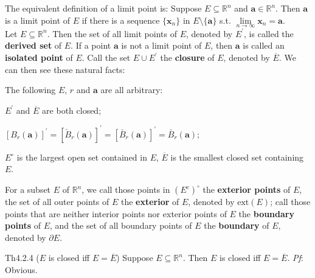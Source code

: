 \documentclass{article}
\begin{document}
\begin{Rmk}{}
    The equivalent definition of a limit point is: \textcolor{Df}{Suppose $E\subseteq\mathbb{R}^n$ and $\pmb{a}\in\mathbb{R}^n$. Then $\pmb{a}$ is a limit point of $E$ if there is a sequence $\{\pmb{x}_n\}$ in $E\setminus\{\pmb{a}\}$ s.t. $\lim\limits_{n\to\infty} \pmb{x}_n = \pmb{a}$.}\\
    \textcolor{Df}{Let $E\subseteq\mathbb{R}^n$. Then the set of all limit points of $E$, denoted by $E^\prime$, is called the \textbf{derived set} of $E$. If a point $\pmb{a}$ is not a limit point of $E$, then $\pmb{a}$ is called an \textbf{isolated point} of $E$. Call the set $E\cup E^\prime$ the \textbf{closure} of $E$, denoted by $\overline{E}$.} We can then see these natural facts: 
    \textcolor{Th}{The following $E$, $r$ and $\pmb{a}$ are all arbitrary:
    \begin{compactenum}
        \item $E^\prime$ and $\overline{E}$ are both closed;
        \item $[B_r(\pmb{a})]^\prime = [\check{B}_r(\pmb{a})]^\prime = [\bar{B}_r(\pmb{a})]^\prime = \bar{B}_r(\pmb{a})$;
        \item $E^\circ$ is the largest open set contained in $E$, $\overline{E}$ is the smallest closed set containing $E$.
    \end{compactenum}}
    \textcolor{Df}{For a subset $E$ of $\mathbb{R}^n$, we call those points in $(E^c)^\circ$ the \textbf{exterior points} of $E$, the set of all outer points of $E$ the \textbf{exterior} of $E$, denoted by $\text{ext}(E)$; call those points that are neither interior points nor exterior points of $E$ the \textbf{boundary points} of $E$, and the set of all boundary points of $E$ the \textbf{boundary} of $E$, denoted by $\partial E$.} 
\end{Rmk}

\begin{Th}{Th4.2.4 ($E$ is closed iff $E = \overline{E}$)}
    Suppose $E\subseteq\mathbb{R}^n$. Then $E$ is closed iff $E = \overline{E}$.
    \tcblower
    \textit{Pf}: Obvious.
\end{Th}
\end{document}
